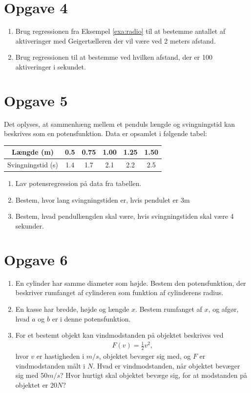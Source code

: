 \section*{Opgave 4}
\begin{enumerate}[label=\roman*)]
\item Brug regressionen fra Eksempel \ref{exa:radio} til at bestemme antallet af aktiveringer med Geigertælleren der vil være ved 2 meters afstand.
\item Brug regressionen til at bestemme ved hvilken afstand, der er 100 aktiveringer i sekundet. 
\end{enumerate}
\section*{Opgave 5}
Det oplyses, at sammenhæng mellem et penduls længde og svingningstid kan beskrives som en potensfunktion. Data er opsamlet i følgende tabel:

\begin{center}\begin{tabular}{c|c|c|c|c|c}
Længde (m)& 0.5 & 0.75 & 1.00 & 1.25 & 1.50\\ \hline
Svingningstid (s) & 1.4 & 1.7 & 2.1 & 2.2 & 2.5 
\end{tabular}
\end{center}
\begin{enumerate}[label=\roman*)]
\item Lav potensregression på data fra tabellen. 
\item Bestem, hvor lang svingningstiden er, hvis pendulet er 3m
\item Bestem, hvad pendullængden skal være, hvis svingningstiden skal være 4 sekunder. 
\end{enumerate}
\section*{Opgave 6}
\begin{enumerate}[label=\roman*)]
\item En cylinder har samme diameter som højde. Bestem den potensfunktion, der beskriver rumfanget af cylinderen som funktion af cylinderens radius. 
\item En kasse har bredde, højde og længde $x$. Bestem rumfanget af $x$, og afgør, hvad $a$ og $b$ er i denne potensfunktion.
\item For et bestemt objekt kan vindmodstanden på objektet beskrives ved 
\begin{align*}
F(v)= \frac{1}{2}v^2,
\end{align*}
hvor $v$ er hastigheden i $m/s$, objektet bevæger sig med, og $F$ er vindmodstanden målt i $N$. Hvad er vindmodstanden, når objektet bevæger sig med 50$m/s$? Hvor hurtigt skal objektet bevæge sig, for at modstanden på objektet er 20$N$?

\end{enumerate}